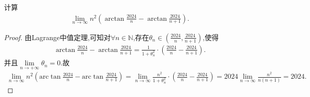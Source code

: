 \documentclass[../../main.tex]{subfiles}
\begin{document}
\begin{example}
计算
\begin{align*}
\lim_{n \to \infty} n^2 \left(\arctan\frac{2024}{n} - \arctan\frac{2024}{n + 1}\right).
\end{align*}
\end{example}
\begin{proof}
由Lagrange中值定理,可知对$\forall n\in\mathbb{N}$,存在$\theta_n\in(\frac{2024}{n},\frac{2024}{n + 1})$,使得
\begin{align*}
\arctan\frac{2024}{n} - \arctan\frac{2024}{n + 1} = \frac{1}{1+\theta _{n}^{2}}\cdot \left( \frac{2024}{n}-\frac{2024}{n+1} \right).
\end{align*}
并且$\underset{n\rightarrow +\infty}{\lim}\theta _n=0$.故
\begin{align*}
\lim_{n\rightarrow \infty} n^2\left( \mathrm{arc}\tan \frac{2024}{n}-\mathrm{arc}\tan \frac{2024}{n+1} \right) =\lim_{n\rightarrow \infty} \frac{n^2}{1+\theta _{n}^{2}}\cdot \left( \frac{2024}{n}-\frac{2024}{n+1} \right) =2024\lim_{n\rightarrow \infty} \frac{n^2}{n\left( n+1 \right)}=2024.
\end{align*}
\end{proof}
\end{document}
